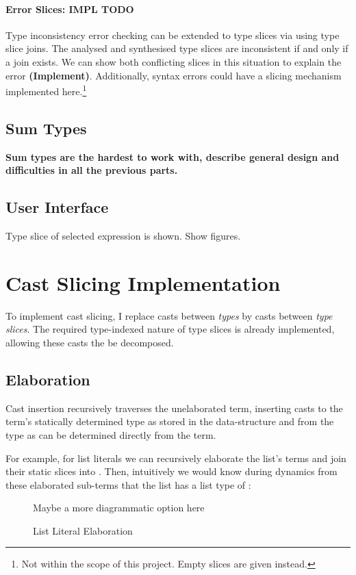 \paragraph{Error Slices: IMPL TODO}
Type inconsistency error checking can be extended to type slices via using type slice joins. The analysed and synthesised type slices are inconsistent if and only if a join exists. We can show both conflicting slices in this situation to explain the error \textbf{(Implement)}. Additionally, syntax errors could have a slicing mechanism implemented here.\footnote{Not within the scope of this project. Empty slices are given instead.}

\subsection{Sum Types}
\textbf{Sum types are the hardest to work with, describe general design and difficulties in all the previous parts.}

\subsection{User Interface}
Type slice of selected expression is shown.
Show figures.

\section{Cast Slicing Implementation}\label{sec:CastSlicingImplementation}
To implement cast slicing, I replace casts between \textit{types} by casts between \textit{type slices}. The required type-indexed nature of type slices is already implemented, allowing these casts the be decomposed.

\subsection{Elaboration}\label{sec:Elaboration}
Cast insertion recursively traverses the unelaborated term, inserting casts to the term's statically determined type as stored in the  data-structure and from the type as can be determined directly from the term. 

For example, for list literals we can recursively elaborate the list's terms and join their static slices into . Then, intuitively we would know during dynamics from these elaborated sub-terms that the list has a list type of :
\begin{figure}[h]
Maybe a more diagrammatic option here
\caption{List Literal Elaboration}
\end{figure}

